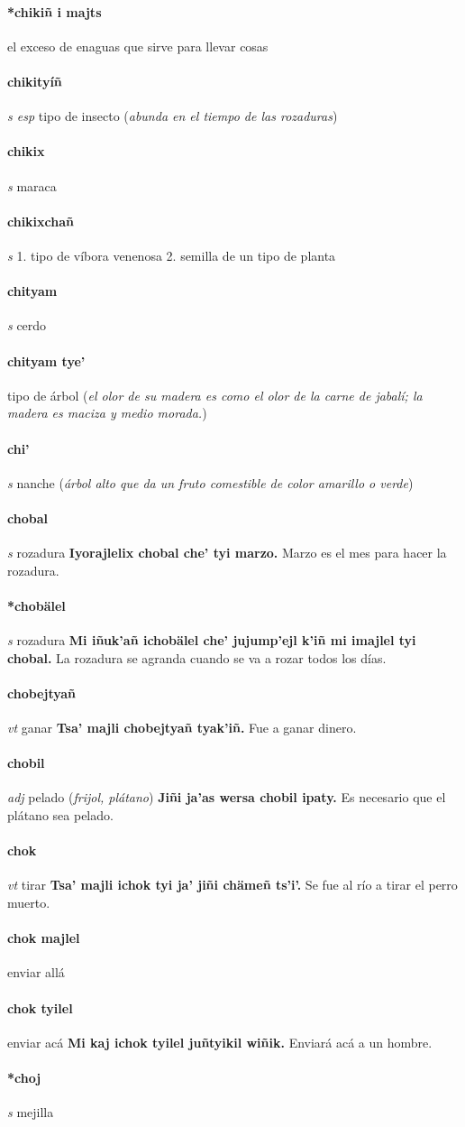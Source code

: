 \documentclass{scrbook}
\newcommand{\entry}[1]{\paragraph{#1}}
\newcommand{\onedefinition}[1]{#1.}
\newcommand{\partofspeech}[1]{\textit{#1}}
\newcommand{\spanishtranslation}[1]{#1}
\newcommand{\clarification}[1]{(\textit{#1})}
\newcommand{\cholexample}[1]{\textbf{#1}}
\newcommand{\exampletranslation}[1]{#1}
\begin{document}
\begin{multicols}{2}
\entry{*chikiñ i majts}
\spanishtranslation{el exceso de enaguas que sirve para llevar cosas}

\entry{chikityíñ}
\partofspeech{s esp}
\spanishtranslation{tipo de insecto}
\clarification{abunda en el tiempo de las rozaduras}

\entry{chikix}
\partofspeech{s}
\spanishtranslation{maraca}

\entry{chikixchañ}
\partofspeech{s}
\onedefinition{1}
\spanishtranslation{tipo de víbora venenosa}
\onedefinition{2}
\spanishtranslation{semilla de un tipo de planta}

\entry{chityam}
\partofspeech{s}
\spanishtranslation{cerdo}

\entry{chityam tye'}
\spanishtranslation{tipo de árbol}
\clarification{el olor de su madera es como el olor de la carne de jabalí; la madera es maciza y medio morada.}

\entry{chi'}
\partofspeech{s}
\spanishtranslation{nanche}
\clarification{árbol alto que da un fruto comestible de color amarillo o verde}

\entry{chobal}
\partofspeech{s}
\spanishtranslation{rozadura}
\cholexample{Iyorajlelix chobal che' tyi marzo.}
\exampletranslation{Marzo es el mes para hacer la rozadura.}

\entry{*chobälel}
\partofspeech{s}
\spanishtranslation{rozadura}
\cholexample{Mi iñuk'añ ichobälel che' jujump'ejl k'iñ mi imajlel tyi chobal.}
\exampletranslation{La rozadura se agranda cuando se va a rozar todos los días.}

\entry{chobejtyañ}
\partofspeech{vt}
\spanishtranslation{ganar}
\cholexample{Tsa' majli chobejtyañ tyak'iñ.}
\exampletranslation{Fue a ganar dinero.}

\entry{chobil}
\partofspeech{adj}
\spanishtranslation{pelado}
\clarification{frijol, plátano}
\cholexample{Jiñi ja'as wersa chobil ipaty.}
\exampletranslation{Es necesario que el plátano sea pelado.}

\entry{chok}
\partofspeech{vt}
\spanishtranslation{tirar}
\cholexample{Tsa' majli ichok tyi ja' jiñi chämeñ ts'i'.}
\exampletranslation{Se fue al río a tirar el perro muerto.}

\entry{chok majlel}
\spanishtranslation{enviar allá}

\entry{chok tyilel}
\spanishtranslation{enviar acá}
\cholexample{Mi kaj ichok tyilel juñtyikil wiñik.}
\exampletranslation{Enviará acá a un hombre.}

\entry{*choj}
\partofspeech{s}
\spanishtranslation{mejilla}


\end{multicols}
\end{document}
